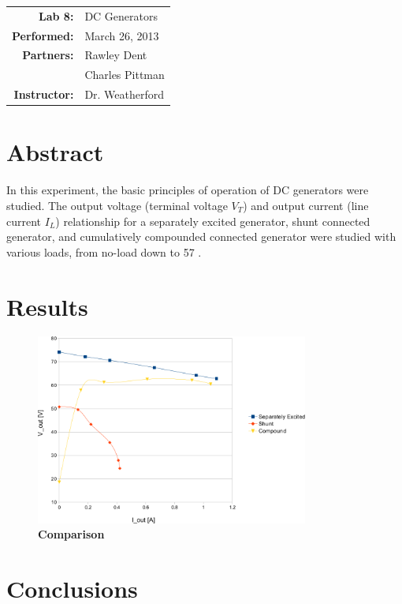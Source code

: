 \documentclass{article}
\begin{document}
\begin{tabular}{rl}
  \textbf{Lab 8:} & DC Generators \\
  \textbf{Performed:} & March 26, 2013 \\
  \textbf{Partners:} & Rawley Dent \\ & Charles Pittman \\
  \textbf{Instructor:} & Dr. Weatherford
\end{tabular}


\section*{Abstract}

In this experiment, the basic principles of operation of DC generators were studied. The output voltage (terminal
voltage $V_T$) and output current (line current $I_L$) relationship for a separately excited generator, shunt 
connected generator, and cumulatively compounded connected generator were studied with various loads, from no-load 
down to 57 \Omega. 

\section*{Results}

\begin{figure}[H]
  \centering
    \includegraphics[width=0.8\textwidth]{img/graph}
    \caption{\textbf{Comparison}}
    \label{fig:graph}
\end{figure}

\section*{Conclusions}
\end{document}
